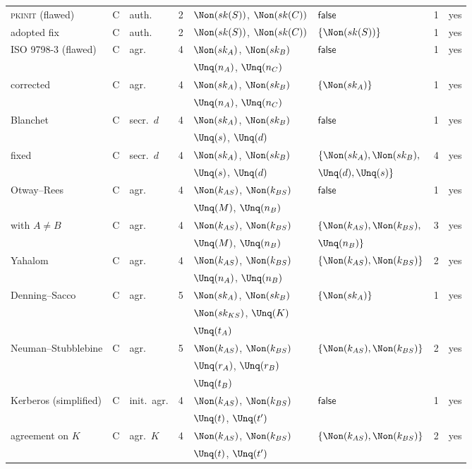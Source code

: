 \begin{table}[tbp]
\begin{tabular}{l c l r l l r c}
\textsc{pkinit} (flawed) & C & auth. & 2 & $\Non(sk(S))$, $\Non(sk(C))$ & $\mathsf{false}$ & 1 & yes\\
\quad adopted fix & C & auth. & 2 & $\Non(sk(S))$, $\Non(sk(C))$ & $\{\Non(sk(S))\}$ & 1 & yes\\
ISO 9798-3 (flawed) & C & agr. & 4 & $\Non(sk_A)$, $\Non(sk_B)$ & $\mathsf{false}$ & 1 & yes\\
 & & & & $\Unq(n_A)$, $\Unq(n_C)$ &  & & \\
\quad corrected & C & agr. & 4 & $\Non(sk_A)$, $\Non(sk_B)$ & $\{\Non(sk_A)\}$ & 1 & yes\\
 & & & & $\Unq(n_A)$, $\Unq(n_C)$ &  & & \\
Blanchet & C & secr.\ $d$ & 4 & $\Non(sk_A)$, $\Non(sk_B)$ & $\mathsf{false}$ & 1 & yes\\
 & & & & $\Unq(s)$, $\Unq(d)$ &  & & \\
\quad fixed & C & secr.\ $d$ & 4 & $\Non(sk_A)$, $\Non(sk_B)$ & $\{\Non(sk_A), \Non(sk_B),$ & 4 & yes\\
 & & & & $\Unq(s)$, $\Unq(d)$ & $\Unq(d), \Unq(s)\}$ & & \\
Otway--Rees & C & agr. & 4 & $\Non(k_{AS})$, $\Non(k_{BS})$ & $\mathsf{false}$ & 1 & yes\\
 & & & & $\Unq(M)$, $\Unq(n_B)$ &  & & \\
\quad with $A \neq B$ & C & agr. & 4 & $\Non(k_{AS})$, $\Non(k_{BS})$ & $\{\Non(k_{AS}), \Non(k_{BS}),$ & 3 & yes\\
 & & & & $\Unq(M)$, $\Unq(n_B)$ & $\Unq(n_B)\}$ & & \\
Yahalom & C & agr. & 4 & $\Non(k_{AS})$, $\Non(k_{BS})$ & $\{\Non(k_{AS}), \Non(k_{BS})\}$ & 2 & yes\\
 & & & & $\Unq(n_A)$, $\Unq(n_B)$ &  & & \\
Denning--Sacco & C & agr. & 5 & $\Non(sk_A)$, $\Non(sk_B)$ & $\{\Non(sk_A)\}$ & 1 & yes\\
 & & & & $\Non(sk_{KS})$, $\Unq(K)$ &  & & \\
 & & & & $\Unq(t_A)$ &  & & \\
Neuman--Stubblebine & C & agr. & 5 & $\Non(k_{AS})$, $\Non(k_{BS})$ & $\{\Non(k_{AS}), \Non(k_{BS})\}$ & 2 & yes\\
 & & & & $\Unq(r_A)$, $\Unq(r_B)$ &  & & \\
 & & & & $\Unq(t_B)$ &  & & \\
Kerberos (simplified) & C & init.\ agr. & 4 & $\Non(k_{AS})$, $\Non(k_{BS})$ & $\mathsf{false}$ & 1 & yes\\
 & & & & $\Unq(t)$, $\Unq(t')$ &  & & \\
\quad agreement on $K$ & C & agr.\ $K$ & 4 & $\Non(k_{AS})$, $\Non(k_{BS})$ & $\{\Non(k_{AS}), \Non(k_{BS})\}$ & 2 & yes\\
 & & & & $\Unq(t)$, $\Unq(t')$ &  & & \\
\bottomrule
\end{tabular}
\end{table}
